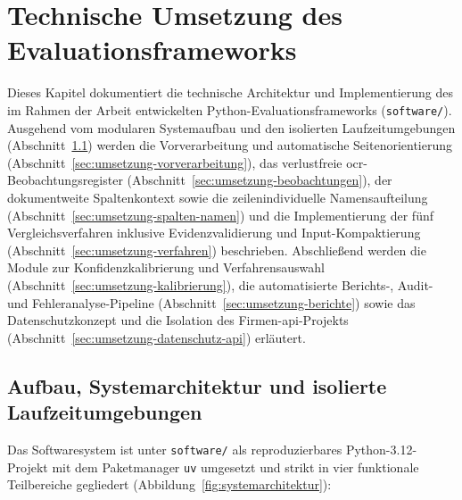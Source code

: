\chapter{Technische Umsetzung des Evaluationsframeworks}
\label{chap:evaluationsframework}

Dieses Kapitel dokumentiert die technische Architektur und Implementierung des im Rahmen der Arbeit entwickelten Python-Evaluationsframeworks (\texttt{software/}). Ausgehend vom modularen Systemaufbau und den isolierten Laufzeitumgebungen (Abschnitt~\ref{sec:systemarchitektur}) werden die Vorverarbeitung und automatische Seitenorientierung (Abschnitt~\ref{sec:umsetzung-vorverarbeitung}), das verlustfreie \ac{ocr}-Beobachtungsregister (Abschnitt~\ref{sec:umsetzung-beobachtungen}), der dokumentweite Spaltenkontext sowie die zeilenindividuelle Namensaufteilung (Abschnitt~\ref{sec:umsetzung-spalten-namen}) und die Implementierung der fünf Vergleichsverfahren inklusive Evidenzvalidierung und Input-Kompaktierung (Abschnitt~\ref{sec:umsetzung-verfahren}) beschrieben. Abschließend werden die Module zur Konfidenzkalibrierung und Verfahrensauswahl (Abschnitt~\ref{sec:umsetzung-kalibrierung}), die automatisierte Berichts-, Audit- und Fehleranalyse-Pipeline (Abschnitt~\ref{sec:umsetzung-berichte}) sowie das Datenschutzkonzept und die Isolation des Firmen-\ac{api}-Projekts (Abschnitt~\ref{sec:umsetzung-datenschutz-api}) erläutert.

\section{Aufbau, Systemarchitektur und isolierte Laufzeitumgebungen}
\label{sec:systemarchitektur}

Das Softwaresystem ist unter \texttt{software/} als reproduzierbares Python-3.12-Projekt mit dem Paketmanager \texttt{uv} umgesetzt und strikt in vier funktionale Teilbereiche gegliedert (Abbildung~\ref{fig:systemarchitektur}):

